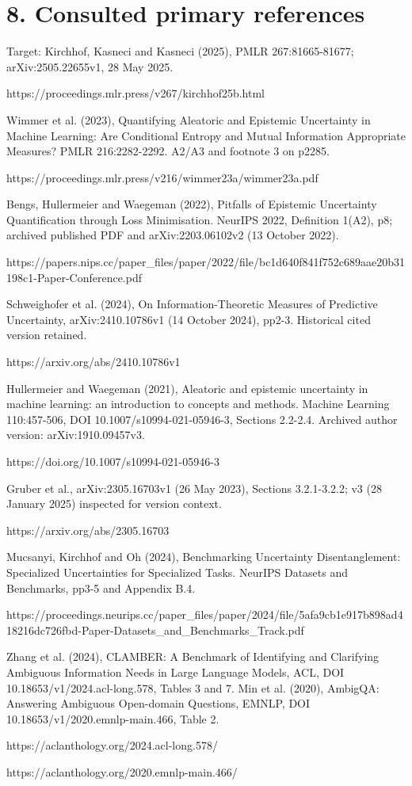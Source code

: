 \documentclass[10pt]{article}
\begin{document}
\section*{8. Consulted primary references}
Target: Kirchhof, Kasneci and Kasneci (2025), PMLR 267:81665-81677; arXiv:2505.22655v1, 28 May 2025.\par
https://proceedings.mlr.press/v267/kirchhof25b.html\par
Wimmer et al. (2023), Quantifying Aleatoric and Epistemic Uncertainty in Machine Learning: Are Conditional Entropy and Mutual Information Appropriate Measures? PMLR 216:2282-2292. A2/A3 and footnote 3 on p2285.\par
https://proceedings.mlr.press/v216/wimmer23a/wimmer23a.pdf\par
Bengs, Hullermeier and Waegeman (2022), Pitfalls of Epistemic Uncertainty Quantification through Loss Minimisation. NeurIPS 2022, Definition 1(A2), p8; archived published PDF and arXiv:2203.06102v2 (13 October 2022).\par
https://papers.nips.cc/paper\_files/paper/2022/file/bc1d640f841f752c689aae20b31198c1-Paper-Conference.pdf\par
Schweighofer et al. (2024), On Information-Theoretic Measures of Predictive Uncertainty, arXiv:2410.10786v1 (14 October 2024), pp2-3. Historical cited version retained.\par
https://arxiv.org/abs/2410.10786v1\par
Hullermeier and Waegeman (2021), Aleatoric and epistemic uncertainty in machine learning: an introduction to concepts and methods. Machine Learning 110:457-506, DOI 10.1007/s10994-021-05946-3, Sections 2.2-2.4. Archived author version: arXiv:1910.09457v3.\par
https://doi.org/10.1007/s10994-021-05946-3\par
Gruber et al., arXiv:2305.16703v1 (26 May 2023), Sections 3.2.1-3.2.2; v3 (28 January 2025) inspected for version context.\par
https://arxiv.org/abs/2305.16703\par
Mucsanyi, Kirchhof and Oh (2024), Benchmarking Uncertainty Disentanglement: Specialized Uncertainties for Specialized Tasks. NeurIPS Datasets and Benchmarks, pp3-5 and Appendix B.4.\par
https://proceedings.neurips.cc/paper\_files/paper/2024/file/5afa9cb1e917b898ad418216dc726fbd-Paper-Datasets\_and\_Benchmarks\_Track.pdf\par
Zhang et al. (2024), CLAMBER: A Benchmark of Identifying and Clarifying Ambiguous Information Needs in Large Language Models, ACL, DOI 10.18653/v1/2024.acl-long.578, Tables 3 and 7. Min et al. (2020), AmbigQA: Answering Ambiguous Open-domain Questions, EMNLP, DOI 10.18653/v1/2020.emnlp-main.466, Table 2.\par
https://aclanthology.org/2024.acl-long.578/\par
https://aclanthology.org/2020.emnlp-main.466/\par
\end{document}
